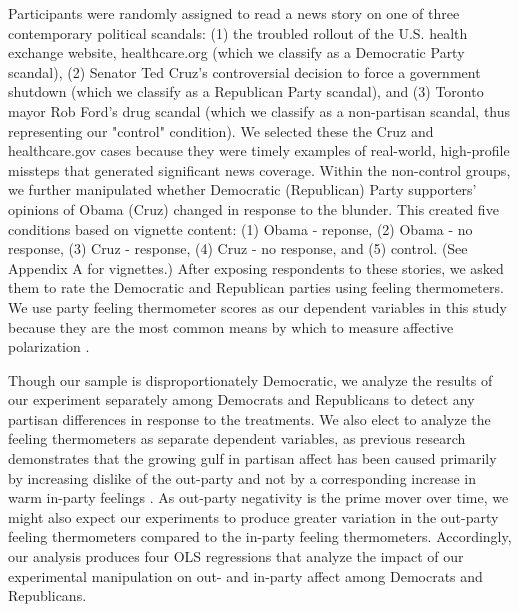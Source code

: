 \documentclass[12pt, letterpaper]{article}
\begin{document}
Participants were randomly assigned to read a news story on one of three contemporary political scandals: (1) the troubled rollout of the U.S. health exchange website, healthcare.org (which we classify as a Democratic Party scandal), (2) Senator Ted Cruz's controversial decision to force a government shutdown (which we classify as a Republican Party scandal), and (3) Toronto mayor Rob Ford's drug scandal (which we classify as a non-partisan scandal, thus representing our "control" condition). We selected these the Cruz and healthcare.gov cases because they were timely examples of real-world, high-profile missteps that generated significant news coverage. Within the non-control groups, we further manipulated whether Democratic (Republican) Party supporters' opinions of Obama (Cruz) changed in response to the blunder. This created five conditions based on vignette content:  (1) Obama - reponse, (2) Obama - no response, (3) Cruz - response, (4) Cruz - no response, and (5) control. (See Appendix A for vignettes.) After exposing respondents to these stories, we asked them to rate the Democratic and Republican parties using feeling thermometers. We use party feeling thermometer scores as our dependent variables in this study because they are the most common means by which to measure affective polarization \citep[e.g.,][]{haidthetherington_2012,hetheringtonrudolph_2015,IyengarSoodLelkes2012,iyengarwestwood_2014,mason_2015}. 

Though our sample is disproportionately Democratic, we analyze the results of our experiment separately among Democrats and Republicans to detect any partisan differences in response to the treatments. We also elect to analyze the feeling thermometers as separate dependent variables, as previous research demonstrates that the growing gulf in partisan affect has been caused primarily by increasing dislike of the out-party and not by a corresponding increase in warm in-party feelings \citep{haidthetherington_2012, IyengarSoodLelkes2012}. As out-party negativity is the prime mover over time, we might also expect our experiments to produce greater variation in the out-party feeling thermometers compared to the in-party feeling thermometers. Accordingly, our analysis produces four OLS regressions that analyze the impact of our experimental manipulation on out- and in-party affect among Democrats and Republicans. 
\end{document}
